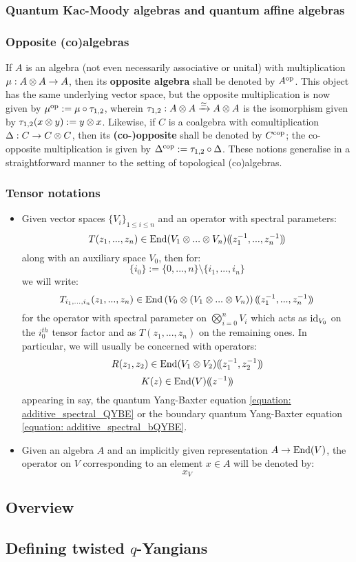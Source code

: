         \subsubsection{Quantum Kac-Moody algebras and quantum affine algebras}

        \subsubsection{Opposite (co)algebras}
            If $A$ is an algebra (not even necessarily associative or unital) with multiplication $\mu: A \tensor A \to A$, then its \textbf{opposite algebra} shall be denoted by $A^{\mathrm{op}}$. This object has the same underlying vector space, but the opposite multiplication is now given by $\mu^{\mathrm{op}} := \mu \circ \tau_{1, 2}$, wherein $\tau_{1, 2}: A \tensor A \xrightarrow[]{\cong} A \tensor A$ is the isomorphism given by $\tau_{1, 2}(x \tensor y) := y \tensor x$. Likewise, if $C$ is a coalgebra with comultiplication $\Delta: C \to C \tensor C$, then its \textbf{(co-)opposite} shall be denoted by $C^{\mathrm{cop}}$; the co-opposite multiplication is given by $\Delta^{\mathrm{cop}} := \tau_{1, 2} \circ \Delta$. These notions generalise in a straightforward manner to the setting of topological (co)algebras.

        \subsubsection{Tensor notations}
            \begin{itemize}
                \item Given vector spaces $\{V_i\}_{1 \leq i \leq n}$ and an operator with spectral parameters:
                    $$T(z_1, ..., z_n) \in \End(V_1 \tensor ... \tensor V_n)(\!(z_1^{-1}, ..., z_n^{-1})\!)$$
                along with an auxiliary space $V_0$, then for:
                    $$\{i_0\} := \{0, ..., n\} \setminus \{i_1, ..., i_n\}$$
                we will write:
                    $$T_{i_1, ..., i_n}(z_1, ..., z_n) \in \End\left(V_0 \tensor (V_1 \tensor ... \tensor V_n)\right)(\!(z_1^{-1}, ..., z_n^{-1})\!)$$
                for the operator with spectral parameter on $\bigotimes_{i = 0}^n V_i$ which acts as $\mathrm{id}_{V_0}$ on the $i_0^{th}$ tensor factor and as $T(z_1, ..., z_n)$ on the remaining ones. In particular, we will usually be concerned with operators:
                    $$R(z_1, z_2) \in \End(V_1 \tensor V_2)(\!(z_1^{-1}, z_2^{-1})\!)$$
                    $$K(z) \in \operatorname{End}(V)(\!(z^{-1})\!)$$
                appearing in say, the quantum Yang-Baxter equation \eqref{equation: additive_spectral_QYBE} or the boundary quantum Yang-Baxter equation \eqref{equation: additive_spectral_bQYBE}.
                \item Given an algebra $A$ and an implicitly given representation $A \to \operatorname{End}(V)$, the operator on $V$ corresponding to an element $x \in A$ will be denoted by:
                    $$x_V$$
            \end{itemize}

    \subsection{Overview}

    \subsection{\texorpdfstring{Defining twisted $q$-Yangians}{}}
        